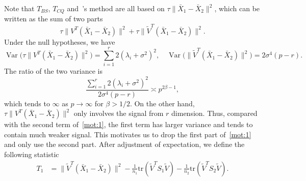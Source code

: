 \documentclass[review]{elsarticle}
\DeclareMathOperator{\myVar}{Var}
\theoremstyle{plain}
\theoremstyle{definition}
\theoremstyle{remark}
\begin{document}
Note that $T_{BS}$, $T_{CQ}$ and~\cite{Ma2015A}'s method are all based on
$
    \tau\|\bar{X}_1-\bar{X}_2\|^2
$, which can be written as the sum of two parts
\begin{equation}\label{mot:1}
    \tau \|V^T (\bar{X}_1-\bar{X}_2)\|^2+
    \tau\|\tilde{V}^T (\bar{X}_1-\bar{X}_2)\|^2.
\end{equation}
Under the null hypotheses, we have
$$\myVar\big(\tau \|V^T (\bar{X}_1-\bar{X}_2)\|^2\big)=\sum_{i=1}^r 2(\lambda_i+\sigma^2)^2,\quad 
\myVar\big(\|\tilde{V}^T (\bar{X}_1-\bar{X}_2)\|^2\big)=2\sigma^4 (p-r).$$
The ratio of the two variance is
$$
\frac{\sum_{i=1}^r 2(\lambda_i+\sigma^2)^2}{2\sigma^4 (p-r)}
\asymp
p^{2\beta-1},
$$
which tends to $\infty$ as $p\to \infty$ for $\beta>1/2$.
On the other hand, $
    \tau \|V^T (\bar{X}_1-\bar{X}_2)\|^2
$ only involves the signal from $r$ dimension.
Thus, compared with the second term of~\eqref{mot:1}, the first term has larger variance and tends to contain much weaker signal.
 This motivates us to drop the first part of~\eqref{mot:1} and only use the second part.
After adjustment of expectation, we define the following statistic
\begin{equation*}
\begin{aligned}
    T_{1}&=\|\tilde{V}^T(\bar{X}_1-\bar{X}_2)\|^2-\frac{1}{n_1}\mathrm{tr}(\tilde{V}^T S_1\tilde{V})-\frac{1}{n_2}\mathrm{tr}(\tilde{V}^T S_2\tilde{V}).
    \\
\end{aligned}
\end{equation*}
\end{document}
